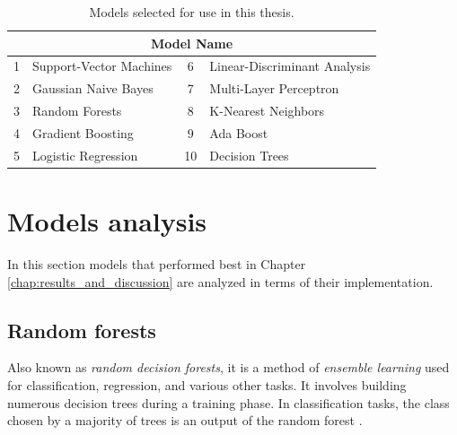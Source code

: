         \begin{table}[htbp]
            \centering
            \begin{tabular}{@{}clcl@{}}
                \toprule
                \multicolumn{4}{c}{\textbf{Model Name}} \\
                \midrule
                1 & Support-Vector Machines & 6 & Linear-Discriminant Analysis \\
                2 & Gaussian Naive Bayes & 7 & Multi-Layer Perceptron \\
                3 & Random Forests & 8 & K-Nearest Neighbors \\
                4 & Gradient Boosting & 9 & Ada Boost \\
                5 & Logistic Regression & 10 & Decision Trees \\
                \bottomrule
            \end{tabular}
            \caption{Models selected for use in this thesis.}
            \label{tab:movements_table}
        \end{table}
    
    \section{Models analysis}
        
        In this section models that performed best in Chapter \ref{chap:results_and_discussion} are analyzed in terms of their implementation.

        \subsection{Random forests}
           Also known as \textit{random decision forests}, it is a method of \textit{ensemble learning} used for classification, regression, and various other tasks. It involves building numerous decision trees during a training phase. In classification tasks, the class chosen by a majority of trees is an output of the random forest \cite{ho_random_1998}.

